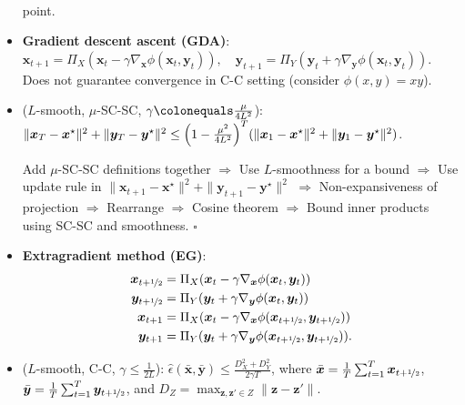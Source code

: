\documentclass[8pt,a4paper]{extarticle}
\renewcommand{\proof}[1]{\begin{tcolorbox}#1 \hfill $\square$\end{tcolorbox}}
\newcommand{\lft}{\mathopen{}\mathclose\bgroup\left}
\newcommand{\rgt}{\aftergroup\egroup\right}
\renewcommand{\vec}[1]{\bm{#1}}
\newenvironment{topic}[1]
{\textbf{\sffamily \colorbox{black}{\rlap{\textbf{\textcolor{white}{#1}}}\hspace{\linewidth}\hspace{-2\fboxsep}}} \\ \vspace{0.2cm}}
{}
\begin{document}
\begin{multicols*}{2}
\begin{topic}{Min-max optimization}
\begin{itemize}
                  point.
            \item \textbf{Gradient descent ascent (GDA)}: \\
                  $\vec{x}_{t+1} = \Pi_X(\vec{x}_t - \gamma \nabla_{\vec{x}} \phi(\vec{x}_t, \vec{y}_t)), \quad \vec{y}_{t+1} = \Pi_Y(\vec{y}_t + \gamma \nabla_{\vec{y}} \phi(\vec{x}_t, \vec{y}_t))$. \\
                  Does not guarantee convergence in C-C setting (consider $\phi(x, y) = xy$).
            \item ($L$-smooth, $\mu$-SC-SC, $\gamma \colonequals \frac{\mu}{4L^2}$): \\
                  $\| \vec{x}_T - \vec{x}^\star \|^2 + \| \vec{y}_T - \vec{y}^\star \|^2 \leq \lft( 1 - \frac{\mu^2}{4L^2} \rgt)^T (\| \vec{x}_1 - \vec{x}^\star \|^2 + \| \vec{y}_1 - \vec{y}^\star \|^2)$.
                  \proof{Add $\mu$-SC-SC definitions together $\Rightarrow$ Use $L$-smoothness for a bound $\Rightarrow$ Use update rule in $\| \vec{x}_{t+1} - \vec{x}^\star \|^2 + \| \vec{y}_{t+1} - \vec{y}^\star \|^2$ $\Rightarrow$ Non-expansiveness of projection $\Rightarrow$ Rearrange $\Rightarrow$ Cosine theorem $\Rightarrow$ Bound inner products using SC-SC and smoothness.}
            \item \textbf{Extragradient method (EG)}:
                  \begin{align*}
                      \vec{x}_{t+\nicefrac{1}{2}} & = \Pi_X(\vec{x}_t - \gamma \nabla_{\vec{x}} \phi(\vec{x}_t, \vec{y}_t))                                      \\
                      \vec{y}_{t+\nicefrac{1}{2}} & = \Pi_Y(\vec{y}_t + \gamma \nabla_{\vec{y}} \phi(\vec{x}_t, \vec{y}_t))                                      \\
                      \vec{x}_{t+1}               & = \Pi_X(\vec{x}_t - \gamma \nabla_{\vec{x}} \phi(\vec{x}_{t+\nicefrac{1}{2}}, \vec{y}_{t+\nicefrac{1}{2}}))  \\
                      \vec{y}_{t+1}               & = \Pi_Y(\vec{y}_t + \gamma \nabla_{\vec{y}} \phi(\vec{x}_{t+\nicefrac{1}{2}}, \vec{y}_{t+\nicefrac{1}{2}})).
                  \end{align*}
            \item ($L$-smooth, C-C, $\gamma \leq \frac{1}{2L}$): $\hat{\epsilon}(\bar{\vec{x}}, \bar{\vec{y}}) \leq \frac{D_X^2 + D_Y^2}{2 \gamma T}$, where $\bar{\vec{x}} = \frac{1}{T} \sum_{t=1}^{T} \vec{x}_{t+\nicefrac{1}{2}}$, $\bar{\vec{y}} = \frac{1}{T} \sum_{t=1}^{T} \vec{y}_{t+\nicefrac{1}{2}}$, and $D_Z = \max_{\vec{z}, \vec{z}' \in Z} \| \vec{z} - \vec{z}' \|$.

\end{itemize}
\end{topic}
\end{multicols*}
\end{document}
